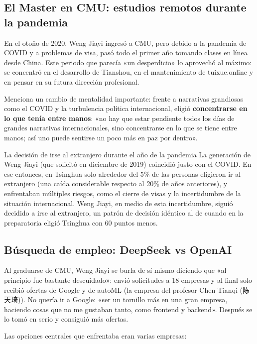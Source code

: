\subsection{El Master en CMU: estudios remotos durante la pandemia}

En el otoño de 2020, Weng Jiayi ingresó a CMU, pero debido a la pandemia de COVID y a problemas de visa, pasó todo el primer año tomando clases en línea desde China. Este periodo que parecía «un desperdicio» lo aprovechó al máximo: se concentró en el desarrollo de Tianshou, en el mantenimiento de tuixue.online y en pensar en su futura dirección profesional.

Menciona un cambio de mentalidad importante: frente a narrativas grandiosas como el COVID y la turbulencia política internacional, eligió \textbf{concentrarse en lo que tenía entre manos}: «no hay que estar pendiente todos los días de grandes narrativas internacionales, sino concentrarse en lo que se tiene entre manos; así uno puede sentirse un poco más en paz por dentro».

\begin{knowledgebox}{La decisión de irse al extranjero durante el año de la pandemia}
La generación de Weng Jiayi (que solicitó en diciembre de 2019) coincidió justo con el COVID. En ese entonces, en Tsinghua solo alrededor del 5\% de las personas eligieron ir al extranjero (una caída considerable respecto al 20\% de años anteriores), y enfrentaban múltiples riesgos, como el cierre de visas y la incertidumbre de la situación internacional. Weng Jiayi, en medio de esta incertidumbre, siguió decidido a irse al extranjero, un patrón de decisión idéntico al de cuando en la preparatoria eligió Tsinghua con 60 puntos menos.
\end{knowledgebox}

\subsection{Búsqueda de empleo: DeepSeek vs OpenAI}

Al graduarse de CMU, Weng Jiayi se burla de sí mismo diciendo que «al principio fue bastante descuidado»: envió solicitudes a 18 empresas y al final solo recibió ofertas de Google y de autoML (la empresa del profesor Chen Tianqi (陈天琦)). No quería ir a Google: «ser un tornillo más en una gran empresa, haciendo cosas que no me gustaban tanto, como frontend y backend». Después se lo tomó en serio y consiguió más ofertas.

Las opciones centrales que enfrentaba eran varias empresas:

